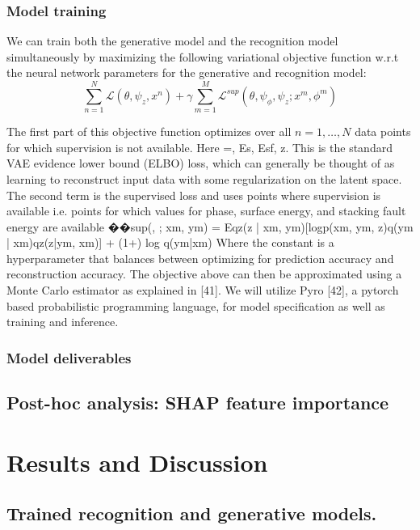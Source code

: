 \documentclass[a4paper]{article}
\begin{document}
\subsubsection{Model training}
 We can train both the generative model and the recognition model simultaneously by maximizing the following variational objective function w.r.t the neural network parameters for the generative and recognition model:
\begin{equation}
    \sum_{n=1}^N \mathcal{L}(\theta, \psi_z, x^n) + \gamma \sum_{m=1}^M \mathcal{L}^\textit{sup}(\theta, \psi_\phi, \psi_z; x^m, \phi^m)
\end{equation}

The first part of this objective function optimizes over all $n={1, \ldots, N}$ data points for which supervision is not available. Here ={, Es, Esf, z}.  This is the standard VAE evidence lower bound (ELBO) loss, which can generally be thought of as learning to reconstruct input data with some regularization on the latent space. The second term is the supervised loss and uses points where supervision is available i.e. points for which values for phase, surface energy, and stacking fault energy are available
��sup(, ; xm, ym) = Eqz(z | xm, ym)[logp(xm, ym, z)q(ym | xm)qz(z|ym, xm)] + (1+) log q(ym|xm)
Where the constant  is a hyperparameter that balances between optimizing for prediction accuracy and reconstruction accuracy. The objective above can then be approximated using a Monte Carlo estimator as explained in [41]. We will utilize Pyro [42], a pytorch based probabilistic programming language, for model specification as well as training and inference.

\subsubsection{Model deliverables}


\subsection{Post-hoc analysis: SHAP feature importance}

\section{Results and Discussion}

\subsection{Trained recognition and generative models.}
\end{document}
